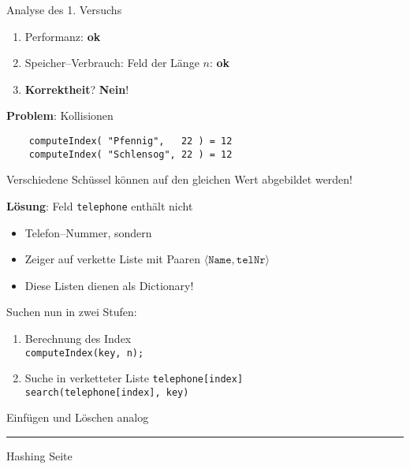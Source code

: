 
\begin{slide}{}
\normalsize

\begin{center}
Analyse des 1. Versuchs
\end{center}
\vspace*{0.5cm}

\footnotesize
\begin{enumerate}
\item Performanz: \textbf{ok}
\item Speicher--Verbrauch: Feld der L\"ange $n$: \textbf{ok}
\item \textbf{Korrektheit}? \textbf{Nein}!
\end{enumerate}

\textbf{Problem}: Kollisionen
\begin{verbatim}
    computeIndex( "Pfennig",   22 ) = 12
    computeIndex( "Schlensog", 22 ) = 12
\end{verbatim}
Verschiedene Sch\"ussel k\"onnen auf den gleichen Wert 
abgebildet werden!
\vspace*{0.5cm}

\textbf{L\"osung}: Feld \texttt{telephone} enth\"alt nicht 
\begin{itemize}
\item Telefon--Nummer, sondern
\item Zeiger auf verkette Liste mit Paaren $\langle \mathtt{Name}, \mathtt{telNr} \rangle$
\item Diese Listen dienen als Dictionary!
\end{itemize}
Suchen nun in zwei Stufen:
\begin{enumerate}
\item Berechnung des Index \\[0.3cm]
     \hspace*{1.3cm} \texttt{computeIndex(key, n);}
\item Suche in verketteter Liste \texttt{telephone[index]} \\[0.3cm]
     \hspace*{1.3cm} \texttt{search(telephone[index], key)}
\end{enumerate}
Einf\"ugen und L\"oschen analog

\vspace*{\fill}
\tiny \addtocounter{mypage}{1}
\rule{17cm}{1mm}
Hashing  \hspace*{\fill} Seite 
\end{slide}

